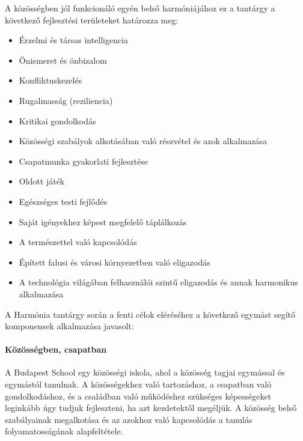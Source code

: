 A közösségben jól funkcionáló egyén belső harmóniájához ez a tantárgy a következő fejlesztési területeket határozza meg:
\begin{itemize}
\item Érzelmi és társas intelligencia

\item Önismeret és önbizalom

\item Konfliktuskezelés

\item Rugalmasság (reziliencia)

\item Kritikai gondolkodás

\item Közösségi szabályok alkotásában való részvétel és azok alkalmazása

\item Csapatmunka gyakorlati fejlesztése

\item Oldott játék

\item Egészséges testi fejlődés

\item Saját igényekhez képest megfelelő táplálkozás

\item A természettel való kapcsolódás

\item Épített falusi és városi környezetben való eligazodás

\item A technológia világában felhasználói szintű eligazodás és annak harmonikus alkalmazása
\end{itemize}

A Harmónia tantárgy során a fenti célok eléréséhez a következő egymást segítő komponensek alkalmazása javasolt:

\paragraph{Közösségben, csapatban}

A Budapest School egy közösségi iskola, ahol a közösség tagjai egymással és egymástól tanulnak. A közösségekhez való tartozáshoz, a csapatban való gondolkodáshoz, és a családban való működéshez szükséges képességeket leginkább úgy tudjuk fejleszteni, ha azt kezdetektől megéljük. A közösség belső szabályainak megalkotása és az azokhoz való kapcsolódás a tanulás folyamatosságának alapfeltétele.

